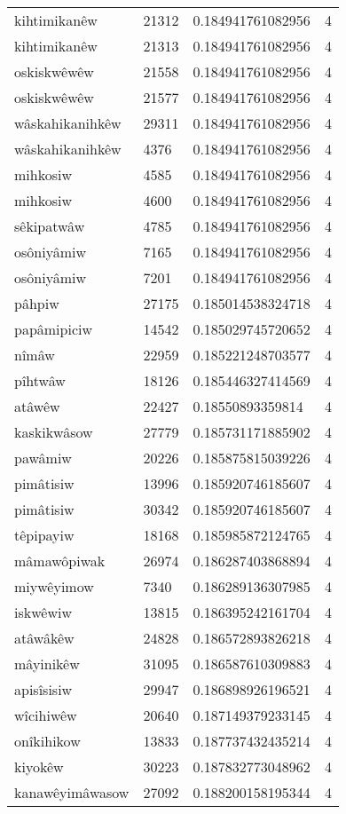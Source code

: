 \begin{longtable}{llll}
kihtimikanêw & 21312 & 0.184941761082956 & 4 \\
kihtimikanêw & 21313 & 0.184941761082956 & 4 \\
oskiskwêwêw & 21558 & 0.184941761082956 & 4 \\
oskiskwêwêw & 21577 & 0.184941761082956 & 4 \\
wâskahikanihkêw & 29311 & 0.184941761082956 & 4 \\
wâskahikanihkêw & 4376 & 0.184941761082956 & 4 \\
mihkosiw & 4585 & 0.184941761082956 & 4 \\
mihkosiw & 4600 & 0.184941761082956 & 4 \\
sêkipatwâw & 4785 & 0.184941761082956 & 4 \\
osôniyâmiw & 7165 & 0.184941761082956 & 4 \\
osôniyâmiw & 7201 & 0.184941761082956 & 4 \\
pâhpiw & 27175 & 0.185014538324718 & 4 \\
papâmipiciw & 14542 & 0.185029745720652 & 4 \\
nîmâw & 22959 & 0.185221248703577 & 4 \\
pîhtwâw & 18126 & 0.185446327414569 & 4 \\
atâwêw & 22427 & 0.18550893359814 & 4 \\
kaskikwâsow & 27779 & 0.185731171885902 & 4 \\
pawâmiw & 20226 & 0.185875815039226 & 4 \\
pimâtisiw & 13996 & 0.185920746185607 & 4 \\
pimâtisiw & 30342 & 0.185920746185607 & 4 \\
têpipayiw & 18168 & 0.185985872124765 & 4 \\
mâmawôpiwak & 26974 & 0.186287403868894 & 4 \\
miywêyimow & 7340 & 0.186289136307985 & 4 \\
iskwêwiw & 13815 & 0.186395242161704 & 4 \\
atâwâkêw & 24828 & 0.186572893826218 & 4 \\
mâyinikêw & 31095 & 0.186587610309883 & 4 \\
apisîsisiw & 29947 & 0.186898926196521 & 4 \\
wîcihiwêw & 20640 & 0.187149379233145 & 4 \\
onîkihikow & 13833 & 0.187737432435214 & 4 \\
kiyokêw & 30223 & 0.187832773048962 & 4 \\
kanawêyimâwasow & 27092 & 0.188200158195344 & 4 \\

\end{longtable}
